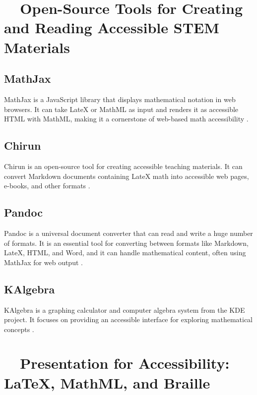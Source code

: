 \section{~~Open-Source Tools for Creating and Reading Accessible STEM Materials}\label{ch11:sec:open-source-tools}
\subsection{MathJax}\label{ch11:ssec:mathjax}
MathJax is a JavaScript library that displays mathematical notation in web browsers. It can take \gls{LateX} or \gls{MathML} as input and renders it as accessible HTML with \gls{MathML}, making it a cornerstone of web-based math accessibility \supercite{MathJax, MathJaxDocs}.

\subsection{Chirun}\label{ch11:ssec:chirun}
Chirun is an open-source tool for creating accessible teaching materials. It can convert Markdown documents containing \gls{LateX} math into accessible web pages, e-books, and other formats \supercite{Chirun}.

\subsection{Pandoc}\label{ch11:ssec:pandoc}
Pandoc is a universal document converter that can read and write a huge number of formats. It is an essential tool for converting between formats like Markdown, \gls{LateX}, HTML, and Word, and it can handle mathematical content, often using MathJax for web output \supercite{Pandoc}.

\subsection{KAlgebra}\label{ch11:ssec:kalgebra}
KAlgebra is a graphing calculator and computer algebra system from the KDE project. It focuses on providing an accessible interface for exploring mathematical concepts \supercite{KAlgebra}.

\section{~~Presentation for Accessibility: LaTeX, MathML, and Braille}\label{ch11:sec:presentation}
